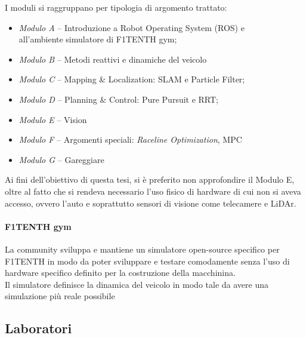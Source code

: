 \noindent I moduli si raggruppano per tipologia di argomento trattato:
\begin{itemize}
	\item \textit{Modulo A} -- Introduzione a Robot Operating System (ROS) e \\
	      all'ambiente simulatore di F1TENTH gym;
	\item \textit{Modulo B} -- Metodi reattivi e dinamiche del veicolo
	\item \textit{Modulo C} -- Mapping \& Localization: SLAM e Particle Filter;
	\item \textit{Modulo D} -- Planning \& Control: Pure Pursuit e RRT;
	\item \textit{Modulo E} -- Vision
	\item \textit{Modulo F} -- Argomenti speciali: \textit{Raceline Optimization}, MPC
	\item \textit{Modulo G} -- Gareggiare
\end{itemize}

\noindent Ai fini dell'obiettivo di questa tesi, si è preferito non approfondire il Modulo E,
oltre al fatto che si rendeva
necessario l'uso fisico di hardware di cui non si aveva accesso,
ovvero l'auto e soprattutto sensori di visione come telecamere e LiDAr.

\paragraph{F1TENTH gym}
La community sviluppa e mantiene un simulatore open-source specifico per F1TENTH
in modo da poter sviluppare e testare comodamente
senza l'uso di hardware specifico definito per la costruzione della macchinina.\\
Il simulatore definisce la dinamica del veicolo in modo tale da avere una simulazione
più reale possibile %

\subsection{Laboratori}

